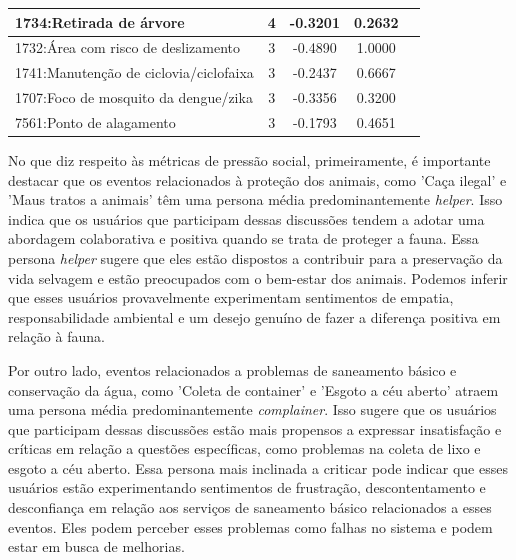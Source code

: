 \begin{table}[htbp]
\begin{tabular}{|l|c|c|c|c|}
		\hline
		1734:Retirada de árvore                     & 4                & -0.3201        & 0.2632           \\
		\hline
		1732:Área com risco de deslizamento         & 3                & -0.4890        & 1.0000           \\
		\hline
		1741:Manutenção de ciclovia/ciclofaixa      & 3                & -0.2437        & 0.6667           \\
		\hline
		1707:Foco de mosquito da dengue/zika        & 3                & -0.3356        & 0.3200           \\
		\hline
		7561:Ponto de alagamento                    & 3                & -0.1793        & 0.4651           \\
		\hline
	\end{tabular}
\end{table}

No que diz respeito às métricas de pressão social, primeiramente, é importante destacar que os eventos relacionados à proteção dos animais, como 'Caça ilegal' e 'Maus tratos a animais' têm uma persona média predominantemente \textit{helper}. Isso indica que os usuários que participam dessas discussões tendem a adotar uma abordagem colaborativa e positiva quando se trata de proteger a fauna. Essa persona \textit{helper} sugere que eles estão dispostos a contribuir para a preservação da vida selvagem e estão preocupados com o bem-estar dos animais. Podemos inferir que esses usuários provavelmente experimentam sentimentos de empatia, responsabilidade ambiental e um desejo genuíno de fazer a diferença positiva em relação à fauna.

Por outro lado, eventos relacionados a problemas de saneamento básico e conservação da água, como 'Coleta de container' e 'Esgoto a céu aberto' atraem uma persona média predominantemente \textit{complainer}. Isso sugere que os usuários que participam dessas discussões estão mais propensos a expressar insatisfação e críticas em relação a questões específicas, como problemas na coleta de lixo e esgoto a céu aberto. Essa persona mais inclinada a criticar pode indicar que esses usuários estão experimentando sentimentos de frustração, descontentamento e desconfiança em relação aos serviços de saneamento básico relacionados a esses eventos. Eles podem perceber esses problemas como falhas no sistema e podem estar em busca de melhorias.

